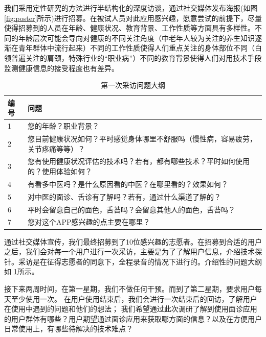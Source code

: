 我们采用定性研究的方法进行半结构化的深度访谈，通过社交媒体发布海报(如图 \ref{fig:poster}所示)进行招募。在被试人员对此应用感兴趣，愿意尝试的前提下，尽量使得招募到的人员在年龄、健康状况、教育背景、工作性质等方面具有多样性。不同的年龄层次可能会导向对健康的不同关注角度（中老年人较为关注的养生知识逐渐在青年群体中流行起来）不同的工作性质使得人们重点关注的身体部位不同（白领普遍关注的肩颈，特殊行业的“职业病”）不同的教育背景使得人们对用技术手段监测健康信息的接受程度也有差异。

\begin{table}[h]
    
    
    \begin{tabular}{ll}
        \toprule
        编号 & 问题 \\
        \midrule
        1  & 您的年龄？职业背景？   \\
        2  & 您目前健康状况如何？平时感觉身体哪里不舒服吗（慢性病，容易疲劳，关节疼痛等等）？   \\
        3  &  您有使用健康状况评估的技术吗？若有，都有哪些技术？平时如何使用的？使用体验如何？  \\
        4  & 有看多中医吗？是什么原因看的中医？在哪里看的？效果如何？   \\
        5   & 对中医的面诊、舌诊有了解吗？若有，通过什么渠道了解的？   \\
        6  & 平时会留意自己的面色，舌苔吗？会留意其他人的面色，舌苔吗？\\
        7   & 您对这个APP感兴趣的点主要在哪里？\\
        \bottomrule
    \end{tabular}
    \caption{第一次采访问题大纲}
    \label{tab:inteview_questions}
\end{table}

通过社交媒体宣传，我们最终招募到了10位感兴趣的志愿者。在招募到合适的用户之后，我们会对每一个用户进行一次采访，主要是为了了解用户信息，介绍技术探针。采访是在征得志愿者的同意下，全程录音的情况下进行的。介绍性的问题大纲如 \ref{tab:inteview_questions}所示。


接下来两周时间，在第一星期，我们不做任何干预。而到了第二星期，要求用户每天至少使用一次。
在用户使用结束后，我们会进行一次结束后的回访，了解用户在使用中遇到的问题和他们的想法；
我们希望通过此次调研了解到使用面诊应用的用户群体有哪些？用户期望通过面诊应用来获取哪方面的信息？以及在方便用户日常使用上，有哪些待解决的技术难点？


